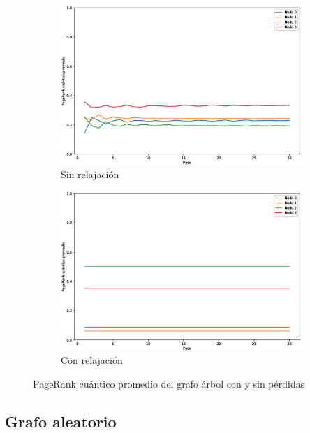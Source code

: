 \begin{figure}[H]
    \centering
    \begin{subfigure}[m]{0.45\textwidth}
        \centering
        \includegraphics[width=0.9\linewidth]{img/tree-mean-lossless.eps}
        \caption{Sin relajación}
    \end{subfigure}
    \begin{subfigure}[m]{0.45\textwidth}
        \centering
        \includegraphics[width=0.9\linewidth]{img/tree-mean-lossy.eps}
        \caption{Con relajación}
    \end{subfigure}
    \caption[PageRank cuántico promedio del grafo árbol con y sin pérdidas]{PageRank cuántico promedio del grafo árbol con y sin pérdidas}
    \label{fig:meantreelossy}
\end{figure}

\subsection{Grafo aleatorio}

